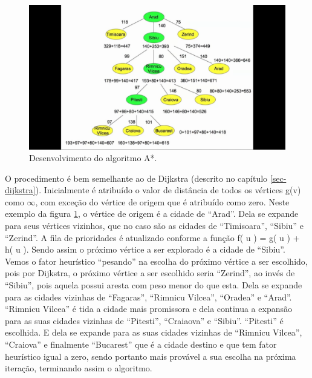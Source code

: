 \begin{figure}[H]
\centering
\includegraphics[width=.85\textwidth]{figuras/Aestrela-mapa2} 
\caption{Desenvolvimento do algoritmo A*.}
\label{fig-aestrela-algoritmo-mapa2}
\end{figure}

O procedimento é bem semelhante ao de Dijkstra (descrito no capítulo \ref{sec-dijkstra}). Inicialmente é atribuído o valor de distância de todos os vértices g(v) como $\infty$, com exceção do vértice de origem que é atribuído como zero. Neste exemplo da figura \ref{fig-aestrela-algoritmo-mapa2}, o vértice de origem é a cidade de ``Arad''. Dela se expande para seus vértices vizinhos, que no caso são as cidades de ``Timisoara'', ``Sibiu'' e ``Zerind''. A fila de prioridades é atualizado conforme a função f( u ) = g( u ) + h( u ). Sendo assim o próximo vértice a ser explorado é a cidade de ``Sibiu''. Vemos o fator heurístico ``pesando'' na escolha do próximo vértice a ser escolhido, pois por Dijkstra, o próximo vértice a ser escolhido seria ``Zerind'', ao invés de ``Sibiu'', pois aquela possui aresta com peso menor do que esta. Dela se expande para as cidades vizinhas de ``Fagaras'', ``Rimnicu Vilcea'', ``Oradea'' e ``Arad''. ``Rimnicu Vilcea'' é tida a cidade mais promissora e dela continua a expansão para as suas cidades vizinhas de ``Pitesti'', ``Craiaova'' e ``Sibiu''. ``Pitesti'' é escolhida. E dela se expande para as suas cidades vizinhas de ``Rimnicu Vilcea'', ``Craiova'' e finalmente ``Bucarest'' que é a cidade destino e que tem fator heurístico igual a zero, sendo portanto mais provável a sua escolha na próxima iteração, terminando assim o algoritmo.






